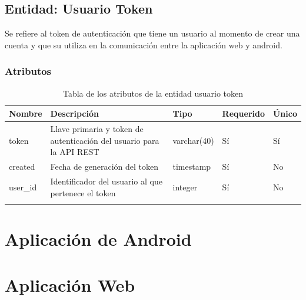 \subsection{Entidad: Usuario Token}
Se refiere al token de autenticación que tiene un usuario al momento de crear una cuenta y que su utiliza en la comunicación entre la aplicación web y android.
\subsubsection{Atributos}
\begin{center}
	\begin{longtable}{|J{3cm}|J{4cm}|J{3cm}|J{2cm}|J{2cm}|}
		\hline
		\textbf{Nombre} & \textbf{Descripción} & \textbf{Tipo} & \textbf{Requerido} & \textbf{Único} \\ \hline
		token & Llave primaria y token de autenticación del usuario para la API REST & varchar(40) & Sí &  Sí\\ \hline
		created & Fecha de generación del token & timestamp & Sí & No\\ \hline
		user\_id & Identificador del usuario al que pertenece el token& integer & Sí & No\\ \hline
		\caption{Tabla de los atributos de la entidad usuario token}
		\label{tbl:entidad-usuario-token}
	\end{longtable}
\end{center}

\section{Aplicación de Android}

\newpage
\section{Aplicación Web}

\newpage

\newpage

